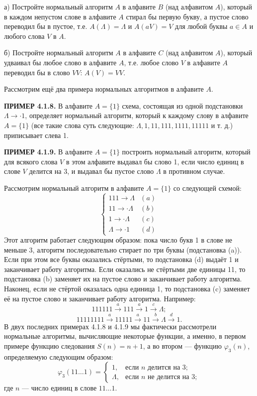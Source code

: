 \documentclass[a4paper,12pt]{article}
\begin{document}
а) Постройте нормальный алгоритм \(A\) в алфавите \(B\) (над алфавитом \(A\)), который в каждом непустом слове в алфавите \(A\) стирал бы первую букву, а пустое слово переводил бы в пустое, т.е. \(A(\Lambda) = \Lambda\) и \(A(aV) = V\) для любой буквы \(a \in A\) и любого слова \(V\) в \(A\).

б) Постройте нормальный алгоритм \(A\) в алфавите \(C\) (над алфавитом \(A\)), который удваивал бы любое слово в алфавите \(A\), т.е. любое слово \(V\) в алфавите \(A\) переводил бы в слово \(VV\): \(A(V) = VV\).

Рассмотрим ещё два примера нормальных алгоритмов в алфавите \(A\).

\textbf{ПРИМЕР 4.1.8.} В алфавите \(A = \{1\}\) схема, состоящая из одной подстановки \(\Lambda \to \cdot 1\), определяет нормальный алгоритм, который к каждому слову в алфавите \(A = \{1\}\) (все такие слова суть следующие: \(\Lambda, 1, 11, 111, 1111, 11111\) и т. д.) приписывает слева 1.

\textbf{ПРИМЕР 4.1.9.} В алфавите \(A = \{1\}\) построить нормальный алгоритм, который для всякого слова \(V\) в этом алфавите выдавал бы слово 1, если число единиц в слове \(V\) делится на 3, и выдавал бы пустое слово \(\Lambda\) в противном случае.

Рассмотрим нормальный алгоритм в алфавите \(A = \{1\}\) со следующей схемой:
\[
\begin{cases}
111 \to \Lambda & (a) \\
11 \to \cdot \Lambda & (b) \\
1 \to \cdot \Lambda & (c) \\
\Lambda \to \cdot 1 & (d)
\end{cases}
\]
Этот алгоритм работает следующим образом: пока число букв 1 в слове не меньше 3, алгоритм последовательно стирает по три буквы (подстановка (a)). Если при этом все буквы оказались стёртыми, то подстановка (d) выдаёт 1 и заканчивает работу алгоритма. Если оказались не стёртыми две единицы 11, то подстановка (b) заменяет их на пустое слово и заканчивает работу алгоритма. Наконец, если не стёртой оказалась одна единица 1, то подстановка (c) заменяет её на пустое слово и заканчивает работу алгоритма. Например:
\[
111111 \xrightarrow{a} 111 \xrightarrow{a} 1 \xrightarrow{c} \Lambda;
\]
\[
11111111 \xrightarrow{a} 11111 \xrightarrow{a} 11 \xrightarrow{b} \Lambda \xrightarrow{d} 1.
\]
В двух последних примерах 4.1.8 и 4.1.9 мы фактически рассмотрели нормальные алгоритмы, вычисляющие некоторые функции, а именно, в первом примере функцию следования \(S(n) = n + 1\), а во втором --- функцию \(\varphi_3(n)\), определяемую следующим образом:
\[
\varphi_3(11\dots1) = 
\begin{cases}
1, & \text{если } n \text{ делится на } 3; \\
\Lambda, & \text{если } n \text{ не делится на } 3;
\end{cases}
\]
где \(n\) --- число единиц в слове \(11\dots1\).
\end{document}
